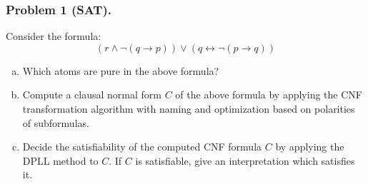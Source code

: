 \subsubsection*{Problem 1 (SAT).}
    Consider the formula:
    \[
        ( r \land \lnot ( q \rightarrow p ) ) \lor ( q \leftrightarrow \lnot ( p \rightarrow q ) )
    \]
    \begin{enumerate}[(a)]
        \item
            Which atoms are pure in the above formula?
        \item\label{subtask:sat-cnf}
            Compute a clausal normal form $C$ of the above formula by
            applying the CNF transformation algorithm with naming and
            optimization based on polarities of subformulas.
        \item
            Decide the satisfiability of the computed CNF formula $C$
            by applying the DPLL method to $C$. If $C$ is
            satisfiable, give an interpretation which
            satisfies it.
    \end{enumerate}

